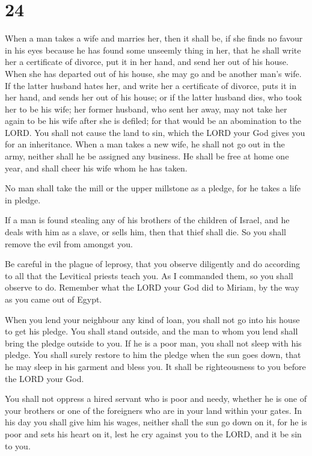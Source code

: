 \hypertarget{section-23}{%
\section{24}\label{section-23}}

 When a man takes a wife and marries her, then it shall be,
if she finds no favour in his eyes because he has found some unseemly
thing in her, that he shall write her a certificate of divorce, put it
in her hand, and send her out of his house.  When she has
departed out of his house, she may go and be another man's wife.
 If the latter husband hates her, and write her a
certificate of divorce, puts it in her hand, and sends her out of his
house; or if the latter husband dies, who took her to be his wife;
 her former husband, who sent her away, may not take her
again to be his wife after she is defiled; for that would be an
abomination to the LORD. You shall not cause the land to sin, which the
LORD your God gives you for an inheritance.  When a man
takes a new wife, he shall not go out in the army, neither shall he be
assigned any business. He shall be free at home one year, and shall
cheer his wife whom he has taken.

 No man shall take the mill or the upper millstone as a
pledge, for he takes a life in pledge.

 If a man is found stealing any of his brothers of the
children of Israel, and he deals with him as a slave, or sells him, then
that thief shall die. So you shall remove the evil from amongst you.

 Be careful in the plague of leprosy, that you observe
diligently and do according to all that the Levitical priests teach you.
As I commanded them, so you shall observe to do.  Remember
what the LORD your God did to Miriam, by the way as you came out of
Egypt.

 When you lend your neighbour any kind of loan, you shall
not go into his house to get his pledge.  You shall stand
outside, and the man to whom you lend shall bring the pledge outside to
you.  If he is a poor man, you shall not sleep with his
pledge.  You shall surely restore to him the pledge when
the sun goes down, that he may sleep in his garment and bless you. It
shall be righteousness to you before the LORD your God.

 You shall not oppress a hired servant who is poor and
needy, whether he is one of your brothers or one of the foreigners who
are in your land within your gates.  In his day you shall
give him his wages, neither shall the sun go down on it, for he is poor
and sets his heart on it, lest he cry against you to the LORD, and it be
sin to you.

